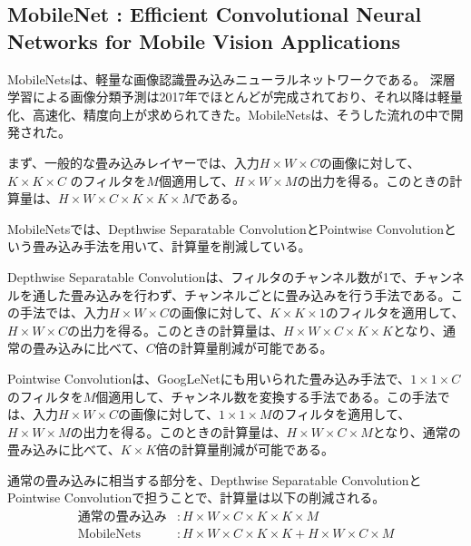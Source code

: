 \documentclass{ltjsarticle}
\begin{document}
\subsection{MobileNet : Efficient Convolutional Neural Networks for Mobile Vision Applications}
MobileNetsは、軽量な画像認識畳み込みニューラルネットワークである。
深層学習による画像分類予測は2017年でほとんどが完成されており、それ以降は軽量化、高速化、精度向上が求められてきた。MobileNetsは、そうした流れの中で開発された。
\par
まず、一般的な畳み込みレイヤーでは、入力$H \times W \times C$の画像に対して、$K \times K \times C$ のフィルタを$M$個適用して、$H \times W \times M$の出力を得る。このときの計算量は、$H \times W \times C \times K \times K \times M$である。
\par
MobileNetsでは、Depthwise Separatable ConvolutionとPointwise Convolutionという畳み込み手法を用いて、計算量を削減している。
\par
Depthwise Separatable Convolutionは、フィルタのチャンネル数が1で、チャンネルを通した畳み込みを行わず、チャンネルごとに畳み込みを行う手法である。この手法では、入力$H \times W \times C$の画像に対して、$K \times K \times 1$のフィルタを適用して、$H \times W \times C$の出力を得る。このときの計算量は、$H \times W \times C \times K \times K$となり、通常の畳み込みに比べて、$C$倍の計算量削減が可能である。
\par
Pointwise Convolutionは、GoogLeNetにも用いられた畳み込み手法で、$1 \times 1 \times C$のフィルタを$M$個適用して、チャンネル数を変換する手法である。この手法では、入力$H \times W \times C$の画像に対して、$1 \times 1 \times M$のフィルタを適用して、$H \times W \times M$の出力を得る。このときの計算量は、$H \times W \times C \times M$となり、通常の畳み込みに比べて、$K \times K$倍の計算量削減が可能である。
\par
通常の畳み込みに相当する部分を、Depthwise Separatable ConvolutionとPointwise Convolutionで担うことで、計算量は以下の削減される。
\begin{align}
  \text{通常の畳み込み} & : H \times W \times C \times K \times K \times M \\
  \text{MobileNets} & : H \times W \times C \times K \times K + H \times W \times C \times M
\end{align}
\end{document}
